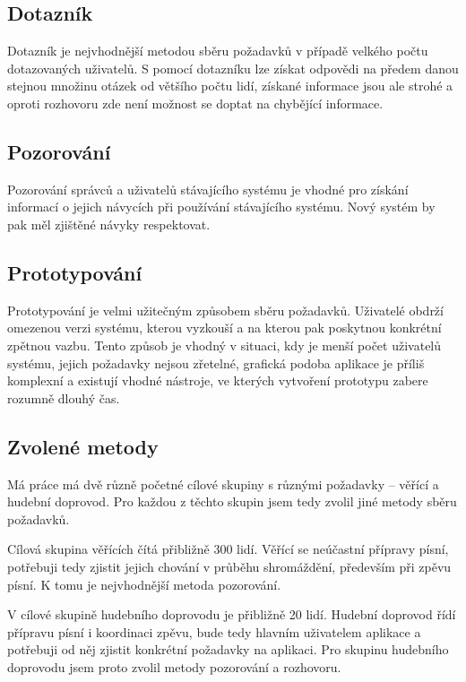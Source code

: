 \subsection{Dotazník}

Dotazník je nejvhodnější metodou sběru požadavků v případě velkého počtu dotazovaných uživatelů. S pomocí dotazníku lze získat odpovědi na předem danou stejnou množinu otázek od většího počtu lidí, získané informace jsou ale strohé a oproti rozhovoru zde není možnost se doptat na chybějící informace. \cite{determining-system-requirements}

\subsection{Pozorování}

Pozorování správců a uživatelů stávajícího systému je vhodné pro získání informací o jejich návycích při používání stávajícího systému. Nový systém by pak měl zjištěné návyky respektovat.

\subsection{Prototypování}

Prototypování je velmi užitečným způsobem sběru požadavků. Uživatelé obdrží omezenou verzi systému, kterou vyzkouší a na kterou pak poskytnou konkrétní zpětnou vazbu. Tento způsob je vhodný v situaci, kdy je menší počet uživatelů systému, jejich požadavky nejsou zřetelné, grafická podoba aplikace je příliš komplexní a existují vhodné nástroje, ve kterých vytvoření prototypu zabere rozumně dlouhý čas. \cite{determining-system-requirements}

\subsection{Zvolené metody}

Má práce má dvě různě početné cílové skupiny s různými požadavky -- věřící a hudební doprovod. Pro každou z těchto skupin jsem tedy zvolil jiné metody sběru požadavků.

Cílová skupina věřících čítá přibližně 300 lidí. Věřící se neúčastní přípravy písní, potřebuji tedy zjistit jejich chování v průběhu shromáždění, především při zpěvu písní. K tomu je nejvhodnější metoda pozorování.

V cílové skupině hudebního doprovodu je přibližně 20 lidí. Hudební doprovod řídí přípravu písní i koordinaci zpěvu, bude tedy hlavním uživatelem aplikace a potřebuji od něj zjistit konkré\-tní požadavky na aplikaci. Pro skupinu hudebního doprovodu jsem proto zvolil metody pozorování a rozhovoru.

